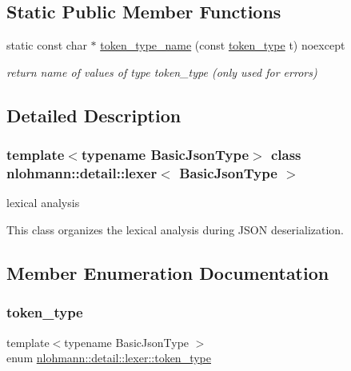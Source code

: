 \subsection*{Static Public Member Functions}
\begin{DoxyCompactItemize}
\item 
\mbox{\label{classnlohmann_1_1detail_1_1lexer_ae514e2005f0ce185f1ad366139e541e8}} 
static const char $\ast$ \hyperlink{classnlohmann_1_1detail_1_1lexer_ae514e2005f0ce185f1ad366139e541e8}{token\+\_\+type\+\_\+name} (const \hyperlink{classnlohmann_1_1detail_1_1lexer_a3f313cdbe187cababfc5e06f0b69b098}{token\+\_\+type} t) noexcept
\begin{DoxyCompactList}\small\item\em return name of values of type token\+\_\+type (only used for errors) \end{DoxyCompactList}\end{DoxyCompactItemize}


\subsection{Detailed Description}
\subsubsection*{template$<$typename Basic\+Json\+Type$>$\newline
class nlohmann\+::detail\+::lexer$<$ Basic\+Json\+Type $>$}

lexical analysis 

This class organizes the lexical analysis during J\+S\+ON deserialization. 

\subsection{Member Enumeration Documentation}
\mbox{\label{classnlohmann_1_1detail_1_1lexer_a3f313cdbe187cababfc5e06f0b69b098}} 
\subsubsection{\texorpdfstring{token\+\_\+type}{token\_type}}
{\footnotesize\ttfamily template$<$typename Basic\+Json\+Type $>$ \\
enum \hyperlink{classnlohmann_1_1detail_1_1lexer_a3f313cdbe187cababfc5e06f0b69b098}{nlohmann\+::detail\+::lexer\+::token\+\_\+type}\hspace{0.3cm}{\ttfamily [strong]}}



